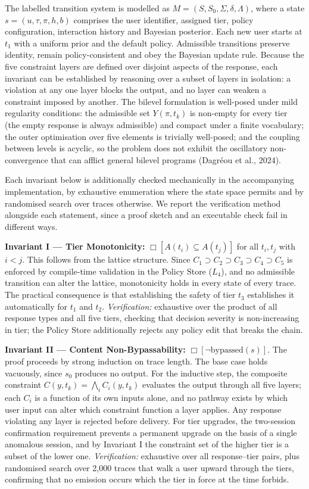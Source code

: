\documentclass[fleqn,10pt]{wlscirep}
\begin{document}
The labelled transition system is modelled as $M = (S, S_0, \Sigma, \delta, \Lambda)$, where a state $s = (u, \tau, \pi, h, b)$ comprises the user identifier, assigned tier, policy configuration, interaction history and Bayesian posterior. Each new user starts at $t_1$ with a uniform prior and the default policy. Admissible transitions preserve identity, remain policy-consistent and obey the Bayesian update rule. Because the five constraint layers are defined over disjoint aspects of the response, each invariant can be established by reasoning over a subset of layers in isolation: a violation at any one layer blocks the output, and no layer can weaken a constraint imposed by another. The bilevel formulation is well-posed under mild regularity conditions: the admissible set $Y(\pi, t_k)$ is non-empty for every tier (the empty response is always admissible) and compact under a finite vocabulary; the outer optimisation over five elements is trivially well-posed; and the coupling between levels is acyclic, so the problem does not exhibit the oscillatory non-convergence that can afflict general bilevel programs (Dagr\'{e}ou et al., 2024)\cite{Dagreou2024}.

Each invariant below is additionally checked mechanically in the accompanying implementation, by exhaustive enumeration where the state space permits and by randomised search over traces otherwise. We report the verification method alongside each statement, since a proof sketch and an executable check fail in different ways.

\textbf{Invariant I --- Tier Monotonicity:} $\Box[A(t_i) \subseteq A(t_j)]$ for all $t_i, t_j$ with $i < j$. This follows from the lattice structure. Since $C_1 \supset C_2 \supset C_3 \supset C_4 \supset C_5$ is enforced by compile-time validation in the Policy Store ($L_4$), and no admissible transition can alter the lattice, monotonicity holds in every state of every trace. The practical consequence is that establishing the safety of tier $t_3$ establishes it automatically for $t_1$ and $t_2$. \emph{Verification:} exhaustive over the product of all response types and all five tiers, checking that decision severity is non-increasing in tier; the Policy Store additionally rejects any policy edit that breaks the chain.

\textbf{Invariant II --- Content Non-Bypassability:} $\Box[\neg\text{bypassed}(s)]$. The proof proceeds by strong induction on trace length. The base case holds vacuously, since $s_0$ produces no output. For the inductive step, the composite constraint $C(y, t_k) = \bigwedge_i C_i(y, t_k)$ evaluates the output through all five layers; each $C_i$ is a function of its own inputs alone, and no pathway exists by which user input can alter which constraint function a layer applies. Any response violating any layer is rejected before delivery. For tier upgrades, the two-session confirmation requirement prevents a permanent upgrade on the basis of a single anomalous session, and by Invariant I the constraint set of the higher tier is a subset of the lower one. \emph{Verification:} exhaustive over all response--tier pairs, plus randomised search over 2,000 traces that walk a user upward through the tiers, confirming that no emission occurs which the tier in force at the time forbids.
\end{document}

